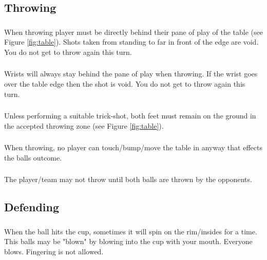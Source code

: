 	\subsection{Throwing}\label{ssec:Throwing}
		\subsubsection{}\label{sssec:Throwing,stand_behind}
			When throwing player must be directly behind their pane of play of the table (see Figure \ref{fig:table}).
            Shots taken from standing to far in front of the edge are void. You do not get to throw again this turn.
		\subsubsection{}\label{sssec:Throwing,wrists}
			 Wrists will always stay behind the pane of play when throwing.
             If the wrist goes over the table edge then the shot is void. You do not get to throw again this turn.
		\subsubsection{}\label{sssec:Throwing,feet}
            Unless performing a suitable trick-shot, both feet must remain on the ground in the accepted throwing zone (see Figure \ref{fig:table}).
		\subsubsection{}\label{sssec:Throwing,bumping_table}
			When throwing, no player can touch/bump/move the table in anyway that effects the balls outcome.
		\subsubsection{}\label{sssec:Throwing,possesion}
			The player/team may not throw until both balls are thrown by the opponents.

	\subsection{Defending}\label{ssec:Defending}
		\subsubsection{}\label{sssec:Defending,blowing}
			When the ball hits the cup, sometimes it will spin on the rim/insides for a time.
            This balls may be "blown" by  blowing into the cup with your mouth.
            Everyone blows.
            Fingering is not allowed.

